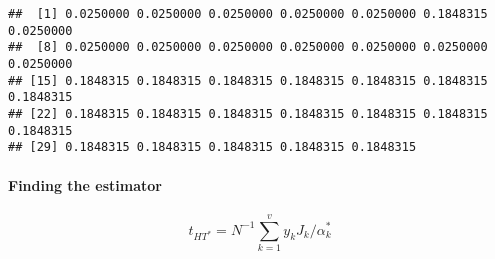 \documentclass[
]{article}
\newenvironment{Shaded}{\begin{snugshade}}{\end{snugshade}}
\newcommand{\CommentTok}[1]{\textcolor[rgb]{0.56,0.35,0.01}{\textit{#1}}}
\newcommand{\ControlFlowTok}[1]{\textcolor[rgb]{0.13,0.29,0.53}{\textbf{#1}}}
\newcommand{\DecValTok}[1]{\textcolor[rgb]{0.00,0.00,0.81}{#1}}
\newcommand{\FunctionTok}[1]{\textcolor[rgb]{0.13,0.29,0.53}{\textbf{#1}}}
\newcommand{\NormalTok}[1]{#1}
\newcommand{\OtherTok}[1]{\textcolor[rgb]{0.56,0.35,0.01}{#1}}
\newcommand{\SpecialCharTok}[1]{\textcolor[rgb]{0.81,0.36,0.00}{\textbf{#1}}}
\begin{document}
\begin{Shaded}
\end{Shaded}

\begin{verbatim}
##  [1] 0.0250000 0.0250000 0.0250000 0.0250000 0.0250000 0.1848315 0.0250000
##  [8] 0.0250000 0.0250000 0.0250000 0.0250000 0.0250000 0.0250000 0.0250000
## [15] 0.1848315 0.1848315 0.1848315 0.1848315 0.1848315 0.1848315 0.1848315
## [22] 0.1848315 0.1848315 0.1848315 0.1848315 0.1848315 0.1848315 0.1848315
## [29] 0.1848315 0.1848315 0.1848315 0.1848315 0.1848315
\end{verbatim}

\paragraph{Finding the estimator}\label{finding-the-estimator}

\[t_{{HT}^*}=N^{-1}\sum^v_{k=1}y_kJ_k/\alpha^*_k\]
\end{document}
